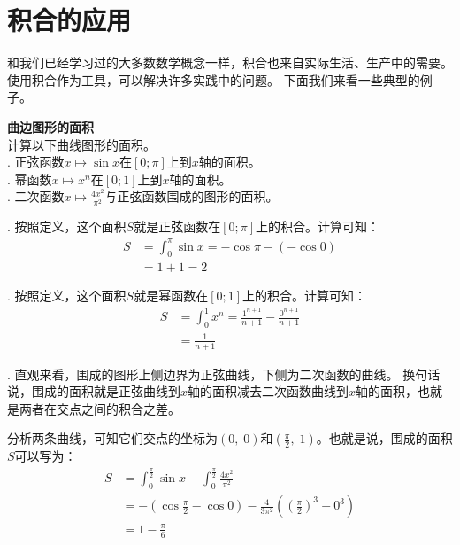 \documentclass[12pt,UTF8]{ctexbook}
\begin{document}
\section{积合的应用}

和我们已经学习过的大多数数学概念一样，积合也来自实际生活、生产中的需要。使用积合作为工具，可以解决许多实践中的问题。
下面我们来看一些典型的例子。

\begin{et}{\textbf{曲边图形的面积}}\\
    计算以下曲线图形的面积。\\
    . 正弦函数$x\mapsto \sin{x}$在$[0;\pi]$上到$x$轴的面积。 \\
    . 幂函数$x\mapsto x^n$在$[0;1]$上到$x$轴的面积。\\
    . 二次函数$x \mapsto \frac{4x^2}{\pi^2}$与正弦函数围成的图形的面积。
\end{et}

\begin{so}
    . 按照定义，这个面积$S$就是正弦函数在$[0;\pi]$上的积合。计算可知：
    \begin{align*}
        S &= \int_{0}^{\pi} \sin{x} = -\cos{\pi} - (-\cos{0}) \\
        &= 1 + 1 = 2
    \end{align*}

    . 按照定义，这个面积$S$就是幂函数在$[0;1]$上的积合。计算可知：
    \begin{align*}
        S &= \int_{0}^{1} x^n = \frac{1^{n+1}}{n+1}- \frac{0^{n+1}}{n+1} \\
        &= \frac{1}{n+1}
    \end{align*}

    . 直观来看，围成的图形上侧边界为正弦曲线，下侧为二次函数的曲线。
    换句话说，围成的面积就是正弦曲线到$x$轴的面积减去二次函数曲线到$x$轴的面积，也就是两者在交点之间的积合之差。

    \indent 分析两条曲线，可知它们交点的坐标为$(0,\;0)$和$\left(\frac{\pi}{2},\;1\right)$。也就是说，围成的面积$S$可以写为：
    \begin{align*}
        S &= \int_{0}^{\frac{\pi}{2}} \sin{x} - \int_{0}^{\frac{\pi}{2}} \frac{4x^2}{\pi^2} \\ 
        &= -\left(\cos{\frac{\pi}{2}} - \cos{0}\right) - \frac{4}{3\pi^2} \left( \left( \frac{\pi}{2} \right)^3 - 0^3 \right) \\
        &= 1 - \frac{\pi}{6}
    \end{align*}
\end{so}
\end{document}
